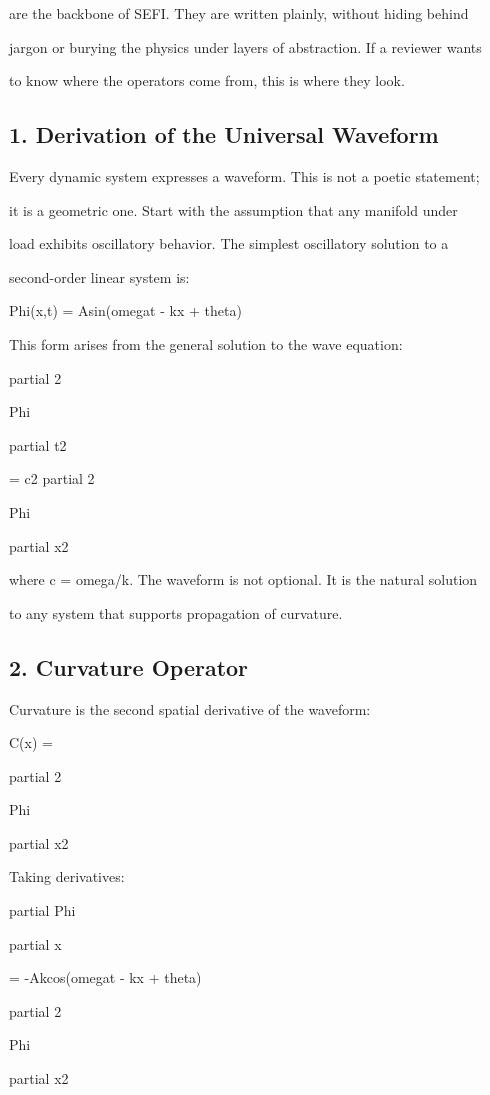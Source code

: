 \documentclass[10pt]{article}
\begin{document}
are the backbone of SEFI. They are written plainly, without hiding behind

jargon or burying the physics under layers of abstraction. If a reviewer wants

to know where the operators come from, this is where they look.

\subsection*{1. Derivation of the Universal Waveform}
Every dynamic system expresses a waveform. This is not a poetic statement;

it is a geometric one. Start with the assumption that any manifold under

load exhibits oscillatory behavior. The simplest oscillatory solution to a

second-order linear system is:

Phi(x,t) = Asin(omegat - kx + theta)

This form arises from the general solution to the wave equation:

partial 2

Phi

partial t2

= c2 partial 2

Phi

partial x2

where c = omega/k. The waveform is not optional. It is the natural solution

to any system that supports propagation of curvature.

\subsection*{2. Curvature Operator}
Curvature is the second spatial derivative of the waveform:

C(x) =

partial 2

Phi

partial x2

Taking derivatives:

partial Phi

partial x

= -Akcos(omegat - kx + theta)


partial 2

Phi

partial x2
\end{document}
